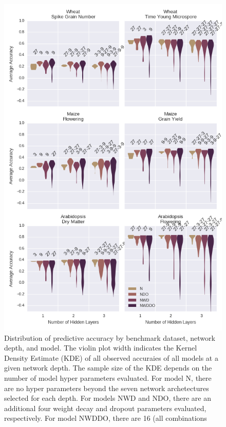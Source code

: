 
\begin{figure}[htbp]
\renewcommand{\familydefault}{\sfdefault}\normalfont
\centering 
\includegraphics[width=\linewidth]{g3_article/figures/depth_comparison.png}
    \caption{Distribution of predictive accuracy by benchmark dataset, network depth, 
             and model. The violin plot width indicates the Kernel Density Estimate 
             (KDE) of all observed accuraies of all models at a given network depth. 
             The sample size of the KDE depends on the number of model hyper 
             parameters evaluated. For model N, there are no hyper 
             parameters beyond the seven network archetectures selected for each depth. 
             For models NWD and NDO, there are an additional four weight decay and dropout 
             parameters evaluated, respectively. For model NWDDO, there are 16 (all combinations 
}
\end{figure}
